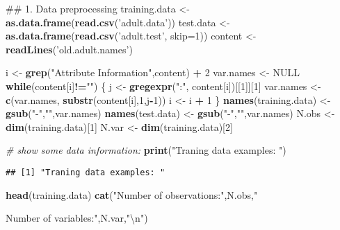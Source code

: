 \documentclass[]{article}
\newenvironment{Shaded}{\begin{snugshade}}{\end{snugshade}}
\newcommand{\KeywordTok}[1]{\textcolor[rgb]{0.13,0.29,0.53}{\textbf{#1}}}
\newcommand{\DataTypeTok}[1]{\textcolor[rgb]{0.13,0.29,0.53}{#1}}
\newcommand{\DecValTok}[1]{\textcolor[rgb]{0.00,0.00,0.81}{#1}}
\newcommand{\CharTok}[1]{\textcolor[rgb]{0.31,0.60,0.02}{#1}}
\newcommand{\StringTok}[1]{\textcolor[rgb]{0.31,0.60,0.02}{#1}}
\newcommand{\CommentTok}[1]{\textcolor[rgb]{0.56,0.35,0.01}{\textit{#1}}}
\newcommand{\OtherTok}[1]{\textcolor[rgb]{0.56,0.35,0.01}{#1}}
\newcommand{\ControlFlowTok}[1]{\textcolor[rgb]{0.13,0.29,0.53}{\textbf{#1}}}
\newcommand{\OperatorTok}[1]{\textcolor[rgb]{0.81,0.36,0.00}{\textbf{#1}}}
\newcommand{\NormalTok}[1]{#1}
\begin{document}
\begin{Shaded}
\begin{Highlighting}[]
\NormalTok{## 1. Data preprocessing}
\NormalTok{training.data <-}\StringTok{ }\KeywordTok{as.data.frame}\NormalTok{(}\KeywordTok{read.csv}\NormalTok{(}\StringTok{'adult.data'}\NormalTok{))}
\NormalTok{test.data <-}\StringTok{ }\KeywordTok{as.data.frame}\NormalTok{(}\KeywordTok{read.csv}\NormalTok{(}\StringTok{'adult.test'}\NormalTok{, }\DataTypeTok{skip=}\DecValTok{1}\NormalTok{))}
\NormalTok{content <-}\StringTok{ }\KeywordTok{readLines}\NormalTok{(}\StringTok{'old.adult.names'}\NormalTok{)}

\NormalTok{i <-}\StringTok{ }\KeywordTok{grep}\NormalTok{(}\StringTok{"Attribute Information"}\NormalTok{,content) }\OperatorTok{+}\StringTok{ }\DecValTok{2}
\NormalTok{  var.names <-}\StringTok{ }\OtherTok{NULL}
  \ControlFlowTok{while}\NormalTok{(content[i]}\OperatorTok{!=}\StringTok{""}\NormalTok{) \{}
\NormalTok{    j <-}\StringTok{ }\KeywordTok{gregexpr}\NormalTok{(}\StringTok{":"}\NormalTok{, content[i])[[}\DecValTok{1}\NormalTok{]][}\DecValTok{1}\NormalTok{]}
\NormalTok{    var.names <-}\StringTok{ }\KeywordTok{c}\NormalTok{(var.names, }\KeywordTok{substr}\NormalTok{(content[i],}\DecValTok{1}\NormalTok{,j}\OperatorTok{-}\DecValTok{1}\NormalTok{))}
\NormalTok{    i <-}\StringTok{ }\NormalTok{i }\OperatorTok{+}\StringTok{ }\DecValTok{1}
\NormalTok{  \}}
  \KeywordTok{names}\NormalTok{(training.data) <-}\StringTok{ }\KeywordTok{gsub}\NormalTok{(}\StringTok{"-"}\NormalTok{,}\StringTok{""}\NormalTok{,var.names)}
  \KeywordTok{names}\NormalTok{(test.data) <-}\StringTok{ }\KeywordTok{gsub}\NormalTok{(}\StringTok{"-"}\NormalTok{,}\StringTok{""}\NormalTok{,var.names)}
\NormalTok{  N.obs <-}\StringTok{ }\KeywordTok{dim}\NormalTok{(training.data)[}\DecValTok{1}\NormalTok{]  }
\NormalTok{  N.var <-}\StringTok{ }\KeywordTok{dim}\NormalTok{(training.data)[}\DecValTok{2}\NormalTok{]}
  
  \CommentTok{# show some data information: }
  \KeywordTok{print}\NormalTok{(}\StringTok{"Traning data examples: "}\NormalTok{)}
\end{Highlighting}
\end{Shaded}

\begin{verbatim}
## [1] "Traning data examples: "
\end{verbatim}

\begin{Shaded}
\begin{Highlighting}[]
  \KeywordTok{head}\NormalTok{(training.data) }
  \KeywordTok{cat}\NormalTok{(}\StringTok{"Number of observations:"}\NormalTok{,N.obs,}\StringTok{"}

\StringTok{     Number of variables:"}\NormalTok{,N.var,}\StringTok{"}\CharTok{\textbackslash{}n}\StringTok{"}\NormalTok{)}
\end{Highlighting}
\end{Shaded}
\end{document}
